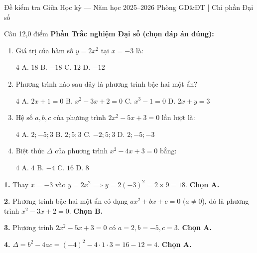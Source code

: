 ﻿%
%
  {Đề kiểm tra Giữa Học kỳ — Năm học 2025--2026}%
  {Phòng GD\&ĐT | Chỉ phần Đại số}

\begin{de_cau}{Câu 1}{2,0 điểm}
\textbf{Phần Trắc nghiệm Đại số (chọn đáp án đúng):}
\begin{enumerate}[label=\arabic*.]
\item Giá trị của hàm số $y = 2x^2$ tại $x = -3$ là:
\begin{multicols}{4}
A. $18$ \newline B. $-18$ \newline C. $12$ \newline D. $-12$
\end{multicols}
\item Phương trình nào sau đây là phương trình bậc hai một ẩn?
\begin{multicols}{4}
A. $2x + 1 = 0$ \newline B. $x^2 - 3x + 2 = 0$ \newline C. $x^3 - 1 = 0$ \newline D. $2x + y = 3$
\end{multicols}
\item Hệ số $a, b, c$ của phương trình $2x^2 - 5x + 3 = 0$ lần lượt là:
\begin{multicols}{4}
A. $2; -5; 3$ \newline B. $2; 5; 3$ \newline C. $-2; 5; 3$ \newline D. $2; -5; -3$
\end{multicols}
\item Biệt thức $\Delta$ của phương trình $x^2 - 4x + 3 = 0$ bằng:
\begin{multicols}{4}
A. $4$ \newline B. $-4$ \newline C. $16$ \newline D. $8$
\end{multicols}
\end{enumerate}
\end{de_cau}

\begin{loi_giai_cau}
\textbf{1.} Thay $x = -3$ vào $y = 2x^2 \implies y = 2(-3)^2 = 2 \times 9 = 18$. \textbf{Chọn A.}

\textbf{2.} Phương trình bậc hai một ẩn có dạng $ax^2 + bx + c = 0$ ($a \neq 0$), đó là phương trình $x^2 - 3x + 2 = 0$. \textbf{Chọn B.}

\textbf{3.} Phương trình $2x^2 - 5x + 3 = 0$ có $a = 2, b = -5, c = 3$. \textbf{Chọn A.}

\textbf{4.} $\Delta = b^2 - 4ac = (-4)^2 - 4 \cdot 1 \cdot 3 = 16 - 12 = 4$. \textbf{Chọn A.}
\end{loi_giai_cau}

